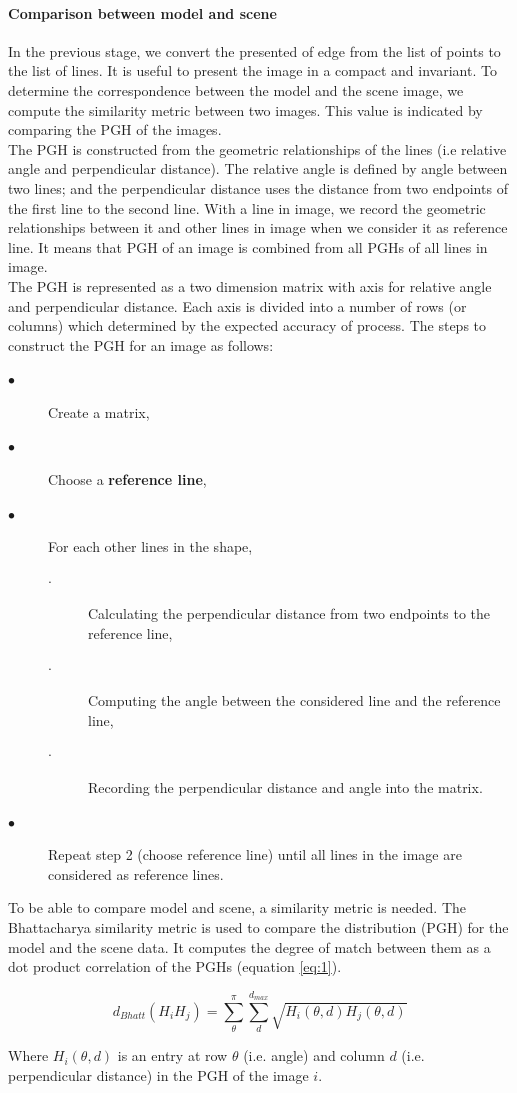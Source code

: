\documentclass[twoside,twocolumn,10pt]{article}
\begin{document}
\paragraph{Comparison between model and scene}
In the previous stage, we convert the presented of edge from the list of points to the list of lines. It is useful to present the image in a compact and invariant. To determine the correspondence between the model and the scene image, we compute the similarity metric between two images. This value is indicated by comparing the PGH\cite{evans1993use} of the images.\\
The PGH is constructed from the geometric relationships of the lines (i.e relative angle and perpendicular distance). The relative angle is defined by angle between two lines; and the perpendicular distance uses the distance from two endpoints of the first line to the second line. With a line in image, we record the geometric relationships  between it and other lines in image when we consider it as reference line. It means that PGH of an image is combined from all PGHs of all lines in image.\\
The PGH is represented as a two dimension matrix with axis for relative angle and perpendicular distance. Each axis is divided into a number of rows (or columns) which determined by the expected accuracy of process. The steps to construct the PGH for an image as follows:
{\small{
\begin{description}
\item[$\bullet$] Create a matrix,
\item[$\bullet$] Choose a \textbf{reference line},
\item[$\bullet$] For each other lines in the shape,
	\begin{description}
		\item[$\cdot$] Calculating the perpendicular distance from two endpoints to the reference line,
		\item[$\cdot$] Computing the angle between the considered line and the reference line,
		\item[$\cdot$] Recording the perpendicular distance and angle into the matrix.
	\end{description}
\item[$\bullet$] Repeat step 2 (choose reference line) until all lines in the image are considered as reference lines.
\end{description}
}}
To be able to compare model and scene, a similarity metric
is needed. The Bhattacharya\cite{palaniswamy2010automatic} similarity
metric is used to compare the distribution (PGH) for the model and the
scene data. It computes the degree of match between them as a dot product correlation of the PGHs (equation \ref{eq:1}).
\begin{center}
\begin{equation} \label{eq:1}
d_{Bhatt} (H_{i}H_{j}) = \sum\limits_{\theta}^{\pi}\sum\limits_{d}^{d_{max}}\sqrt{H_{i}(\theta,d)H_{j}(\theta,d)}
\end{equation}
\end{center}
Where $H_{i}(\theta,d)$ is an entry at row $\theta$ (i.e. angle)  and
column $d$ (i.e. perpendicular distance) in the PGH of the image $i$.
 
\end{document}
